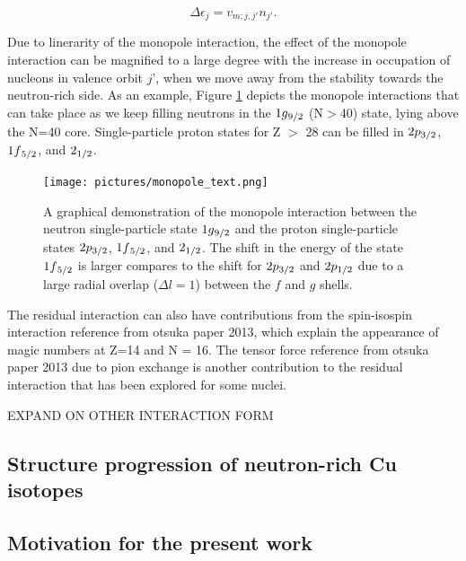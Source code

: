 \documentclass[a4paper,12pt,twoside]{report}
\begin{document}
\begin{equation}
    \Delta \epsilon_{j} = v_{m;j,j'}n_{j'}.
\end{equation}


Due to linerarity of the monopole interaction, the effect of the monopole interaction can be magnified to a large degree with the increase in occupation of nucleons in valence orbit $\textit{j'}$, when we move away from the stability towards the neutron-rich side. As an example, Figure \ref{fig:monopole_interaction} depicts the monopole interactions that can take place as we keep filling neutrons in the $1g\textsubscript{9/2}$ (N$>$40) state, lying above the N=40 core. Single-particle proton states for Z $>$ 28 can be filled in $2p\textsubscript{3/2}$, $1f\textsubscript{5/2}$, and $2\textsubscript{1/2}$. 

\begin{figure}[h!]
    \centering
    \texttt{[image: pictures/monopole\_text.png]}
    \caption[A graphical demonstration of the ]{A graphical demonstration of the monopole interaction between the neutron single-particle state $1g\textsubscript{9/2}$ and the proton single-particle states $2p\textsubscript{3/2}$, $1f\textsubscript{5/2}$, and $2\textsubscript{1/2}$. The shift in the energy of the state $1f\textsubscript{5/2}$ is larger compares to the shift for $2p\textsubscript{3/2}$ and $2p\textsubscript{1/2}$ due to a large radial overlap ($\Delta l = 1$) between the $\textit{f}$ and $\textit{g}$ shells. }
    \label{fig:monopole_interaction}
\end{figure}
The residual interaction can also have contributions from the spin-isospin interaction {reference from otsuka paper 2013}, which explain the appearance of magic numbers at Z=14 and N = 16. The tensor force {reference from otsuka paper 2013} due to pion exchange is another contribution to the residual interaction that has been explored for some nuclei.

EXPAND ON OTHER INTERACTION FORM

\subsection{Structure progression of neutron-rich Cu isotopes}


\subsection{Motivation for the present work}
\end{document}
